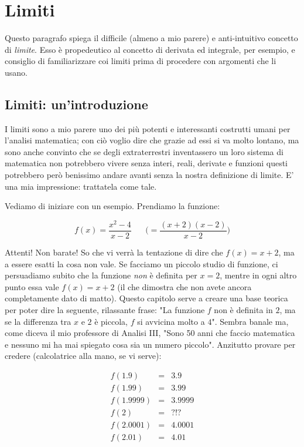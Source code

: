 \label{limiti}
\chapter{Limiti}

Questo paragrafo spiega il difficile (almeno a mio parere) e anti-intuitivo concetto di {\em limite}. Esso è propedeutico al
concetto di derivata ed integrale, per esempio, e consiglio di familiarizzare coi limiti prima di procedere con argomenti che li usano.

\section{Limiti: un'introduzione}

I limiti sono a mio parere uno dei più potenti e interessanti costrutti umani per l'analisi matematica; 
con ciò voglio dire che grazie ad essi si va molto lontano, ma sono anche convinto che se degli extraterrestri 
inventassero un loro sistema di matematica non potrebbero vivere senza interi, reali, derivate e funzioni questi potrebbero 
però benissimo andare avanti senza la nostra definizione di limite. E' una mia impressione: trattatela come tale.

Vediamo di iniziare con un esempio. Prendiamo la funzione:

\begin{equation}
 f(x)=\frac{x^2-4}{x-2} \hspace{20pt} \bigg( = \frac{(x+2)(x-2)}{x-2} \bigg)
\end{equation}

Attenti! Non barate! So che vi verrà la tentazione di dire che $f(x)=x+2$, ma a essere esatti la cosa non vale. Se facciamo
un piccolo studio di funzione, ci persuadiamo subito che la funzione {\em non} è definita per $x=2$, mentre in ogni altro punto
essa vale $f(x)=x+2$ (il che dimostra che non avete ancora completamente dato di matto). Questo capitolo serve a creare una base
teorica per poter dire la seguente, rilassante frase: "La funzione $f$ non è definita in $2$, ma se la differenza tra $x$ e $2$ è
piccola, $f$ si avvicina molto a $4$". Sembra banale ma, come diceva il mio professore di Analisi III, "Sono 50 anni che faccio
matematica e nessuno mi ha mai spiegato cosa sia un numero piccolo". Anzitutto provare per credere (calcolatrice alla mano, se vi serve):

\begin{equation}
\begin{array}{rcl}
 f(1.9) &=&3.9 \\
 f(1.99) &=& 3.99 \\
 f(1.9999) &=& 3.9999 \\
 f(2) & = & ?!? \\
 f(2.0001) &=& 4.0001 \\
 f(2.01) &=& 4.01 
\end{array}
\end{equation}

